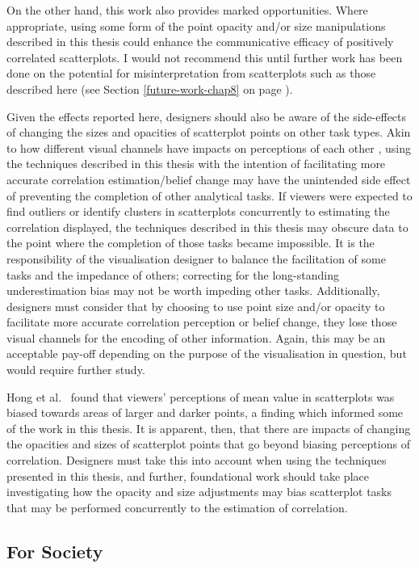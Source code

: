 \documentclass[../main.tex]{subfiles}
\begin{document}
On the other hand, this work also provides marked opportunities. Where
appropriate, using some form of the point opacity and/or size
manipulations described in this thesis could enhance the communicative
efficacy of positively correlated scatterplots. I would not recommend
this until further work has been done on the potential for
misinterpretation from scatterplots such as those described here (see
Section \ref{future-work-chap8} on page \pageref{future-work-chap8}).

Given the effects reported here, designers should also be aware of the
side-effects of changing the sizes and opacities of scatterplot points
on other task types. Akin to how different visual channels have impacts
on perceptions of each other \cite{smart_2019}, using the techniques
described in this thesis with the intention of facilitating more
accurate correlation estimation/belief change may have the unintended
side effect of preventing the completion of other analytical tasks. If
viewers were expected to find outliers or identify clusters in
scatterplots concurrently to estimating the correlation displayed, the
techniques described in this thesis may obscure data to the point where
the completion of those tasks became impossible. It is the
responsibility of the visualisation designer to balance the facilitation
of some tasks and the impedance of others; correcting for the
long-standing underestimation bias may not be worth impeding other
tasks. Additionally, designers must consider that by choosing to use
point size and/or opacity to facilitate more accurate correlation
perception or belief change, they lose those visual channels for the
encoding of other information. Again, this may be an acceptable pay-off
depending on the purpose of the visualisation in question, but would
require further study.

Hong et al.~\cite{hong_2022} found that viewers' perceptions of mean
value in scatterplots was biased towards areas of larger and darker
points, a finding which informed some of the work in this thesis. It is
apparent, then, that there are impacts of changing the opacities and
sizes of scatterplot points that go beyond biasing perceptions of
correlation. Designers must take this into account when using the
techniques presented in this thesis, and further, foundational work
should take place investigating how the opacity and size adjustments may
bias scatterplot tasks that may be performed concurrently to the
estimation of correlation.

\subsection{For Society}\label{for-society}
\end{document}
